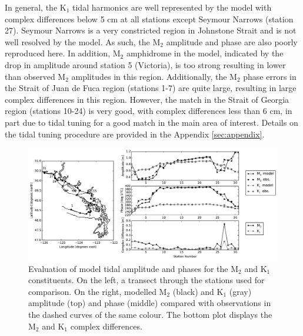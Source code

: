 \documentclass[pdftex,10pt]{article}
\begin{document}
In general, the K$_1$ tidal harmonics are well represented by the model with complex differences below 5 cm at all stations except Seymour Narrows (station 27). Seymour Narrows is a very constricted region in Johnstone Strait and is not well resolved by the model. As such, the M$_2$ amplitude and phase are also poorly reproduced here. In addition, M$_2$ amphidrome in the model, indicated by the drop in amplitude around station 5 (Victoria), is too strong resulting in lower than observed M$_2$ amplitudes in this region. Additionally, the M$_2$ phase errors in the Strait of Juan de Fuca region (stations 1-7) are quite large, resulting in large complex differences in this region.  However, the match in the Strait of Georgia region (stations 10-24) is very good, with complex differences less than 6 cm, in part due to tidal tuning for a good match in the main area of interest. Details on the tidal tuning procedure are provided in the Appendix \ref{sec:appendix}.


\begin{figure}
\centering
\includegraphics[scale=0.6]{Figures/tides.pdf}
\caption{Evaluation of model tidal amplitude and phases for the M$_2$ and K$_1$ constituents. On the left, a transect through the stations used for comparison. On the right, modelled M$_2$ (black) and K$_1$ (gray) amplitude (top) and phase (middle) compared with observations in the dashed curves of the same colour. The bottom plot displays the M$_2$ and K$_1$ complex differences.}
\label{fig:tides}
\end{figure}
\end{document}

